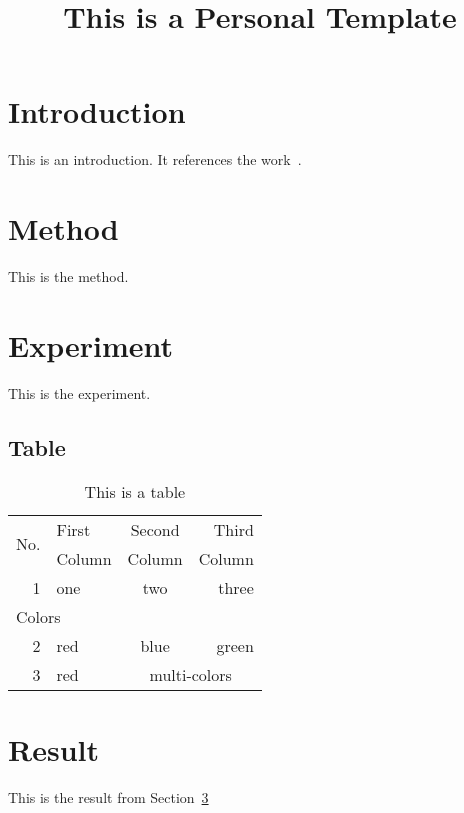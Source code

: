 \documentclass{article}
\begin{document}
\title{This is a Personal \LaTeXe{} Template}
\maketitle

\section{Introduction}
\label{sec:intr}
This is an introduction. It references the work~\cite{shannon2001mathematical}.

\section{Method}
\label{sec:exp}
This is the method.

\section{Experiment}
\label{sec:exp}
This is the experiment.

\subsection{Table}
\begin{table}[h] %
  \centering     %
  \caption[table1]{This is a table}
  \label{tab:table1}

  \begin{tabular}{rlcr} %
    \toprule
    \multirow{2}{*}{No.} & First  & Second & Third  \\
                         & Column & Column & Column \\
    \midrule

    1 & one & two & three \\

    \midrule
    \multicolumn{3}{l}{Colors} \\
    \midrule

    2 & red & blue & green                     \\
    3 & red & \multicolumn{2}{c}{multi-colors} \\
    \bottomrule
  \end{tabular}
\end{table}

\section{Result}
\label{sec:result}
This is the result from Section~\ref{sec:exp}

% 


\end{document}
